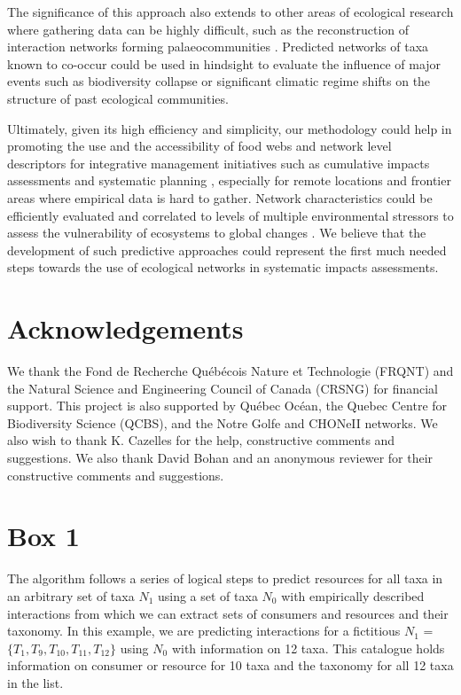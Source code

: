 The significance of this approach also extends to other areas of ecological research where gathering data can be highly difficult, such as the reconstruction of interaction networks forming palaeocommunities \citep[e.g.][]{yeakel2013, yeakel2014}. Predicted networks of taxa known to co-occur could be used in hindsight to evaluate the influence of major events such as biodiversity collapse or significant climatic regime shifts on the structure of past ecological communities.

Ultimately, given its high efficiency and simplicity, our methodology could help in promoting the use and the accessibility of food webs and network level descriptors for integrative management initiatives such as cumulative impacts assessments and systematic planning \citep{giakoumi2015, beauchesne2016}, especially for remote locations and frontier areas where empirical data is hard to gather. Network characteristics could be efficiently evaluated and correlated to levels of multiple environmental stressors to assess the vulnerability of ecosystems to global changes \citep{albouy2014}. We believe that the development of such predictive approaches could represent the first much needed steps towards the use of ecological networks in systematic impacts assessments.

\section{Acknowledgements}
We thank the Fond de Recherche Québécois Nature et Technologie (FRQNT) and the Natural Science and Engineering Council of Canada (CRSNG) for financial support. This project is also supported by Québec Océan, the Quebec Centre for Biodiversity Science (QCBS), and the Notre Golfe and CHONeII networks. We also wish to thank K. Cazelles for the help, constructive comments and suggestions. We also thank David Bohan and an anonymous reviewer for their constructive comments and suggestions.



\section{Box 1}

The algorithm follows a series of logical steps to predict resources for all taxa in an arbitrary set of taxa $N_1$ using a set of taxa $N_0$ with empirically described interactions from which we can extract sets of consumers and resources and their taxonomy. In this example, we are predicting interactions for a fictitious $N_1$
 = $\{T_1, T_9, T_{10},T_{11}, T_{12}\}$ using $N_0$ with information on 12 taxa. This catalogue holds information on consumer or resource for 10 taxa and the taxonomy for all 12 taxa in the list.

